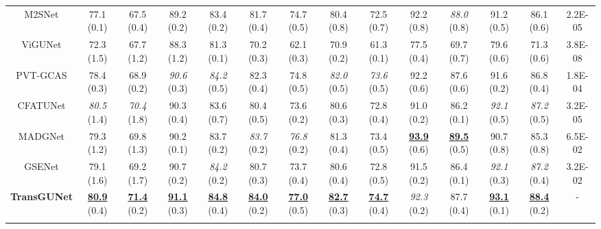 \begin{table*}[t]
\begin{tabular}{c|cc|cc|cc|cc|cc|cc|c}
     M2SNet \cite{zhao2023m}         & 77.1 \tiny{(0.1)} & 67.5 \tiny{(0.4)} & 89.2 \tiny{(0.2)} & 83.4 \tiny{(0.2)} & 81.7 \tiny{(0.4)} & 74.7 \tiny{(0.5)} & 80.4 \tiny{(0.8)} & 72.5 \tiny{(0.7)} & 92.2 \tiny{(0.8)} & \textit{88.0} \tiny{(0.8)} & 91.2 \tiny{(0.5)} & 86.1 \tiny{(0.6)} & 2.2E-05 \\
     ViGUNet \cite{jiang2023vig}     & 72.3 \tiny{(1.5)} & 67.7 \tiny{(1.2)} & 88.3 \tiny{(1.2)} & 81.3 \tiny{(0.1)} & 70.2 \tiny{(0.3)} & 62.1 \tiny{(0.3)} & 70.9 \tiny{(0.2)} & 61.3 \tiny{(0.1)} & 77.5 \tiny{(0.4)} & 69.7 \tiny{(0.7)} & 79.6 \tiny{(0.6)} & 71.3 \tiny{(0.6)} & 3.8E-08 \\
     PVT-GCAS \cite{rahman2024g}    & 78.4 \tiny{(0.3)} & 68.9 \tiny{(0.2)} & \textit{90.6} \tiny{(0.3)} & \textit{84.2} \tiny{(0.5)} & 82.3 \tiny{(0.4)} & 74.8 \tiny{(0.5)} & \textit{82.0} \tiny{(0.5)} & \textit{73.6} \tiny{(0.5)} & 92.2 \tiny{(0.6)} & 87.6 \tiny{(0.6)} & 91.6 \tiny{(0.2)} & 86.8 \tiny{(0.4)} & 1.8E-04 \\
     CFATUNet \cite{wang2024cfatransunet}     & \textit{80.5} \tiny{(1.4)} & \textit{70.4} \tiny{(1.8)} & 90.3 \tiny{(0.4)} & 83.6 \tiny{(0.7)} & 80.4 \tiny{(0.5)} & 73.6 \tiny{(0.2)} & 80.6 \tiny{(0.3)} & 72.8 \tiny{(0.4)} & 91.0 \tiny{(0.2)} & 86.2 \tiny{(0.1)} & \textit{92.1} \tiny{(0.5)} & \textit{87.2} \tiny{(0.5)} & 3.2E-05 \\
     MADGNet \cite{nam2024modality}         & 79.3 \tiny{(1.2)} & 69.8 \tiny{(1.3)} & 90.2 \tiny{(0.1)} & 83.7 \tiny{(0.2)} & \textit{83.7} \tiny{(0.2)} & \textit{76.8} \tiny{(0.2)} & 81.3 \tiny{(0.4)} & 73.4 \tiny{(0.5)} & \textbf{\underline{93.9}} \tiny{(0.6)} & \textbf{\underline{89.5}} \tiny{(0.5)} & 90.7 \tiny{(0.8)} & 85.3 \tiny{(0.8)}  & 6.5E-02 \\ 
     GSENet \cite{li2025gse} & 79.1 \tiny{(1.6)} & 69.2 \tiny{(1.7)} & 90.7 \tiny{(0.2)} & \textit{84.2} \tiny{(0.2)} & 80.7 \tiny{(0.3)} & 73.7 \tiny{(0.4)} & 80.6 \tiny{(0.4)} & 72.8 \tiny{(0.5)} & 91.5 \tiny{(0.2)} & 86.4 \tiny{(0.1)} & \textit{92.1} \tiny{(0.3)} & \textit{87.2} \tiny{(0.4)} & 3.2E-02 \\
     \hline
     \multicolumn{1}{c|}{\multirow{2}{*}{\textbf{TransGUNet}}} & \textbf{\underline{80.9}}  \tiny{(0.4)} & \textbf{\underline{71.4}}  \tiny{(0.2)} & \textbf{\underline{91.1}}  \tiny{(0.3)} & \textbf{\underline{84.8}}  \tiny{(0.4)} & \textbf{\underline{84.0}} \tiny{(0.2)} & \textbf{\underline{77.0}} \tiny{(0.5)} & \textbf{\underline{82.7}} \tiny{(0.3)} & \textbf{\underline{74.7}} \tiny{(0.4)} & \textit{92.3} \tiny{(0.2)} & 87.7 \tiny{(0.4)} & \textbf{\underline{93.1}} \tiny{(0.1)} & \textbf{\underline{88.4}} \tiny{(0.2)} & \multicolumn{1}{c}{\multirow{2}{*}{-}} \\ \cline{2-13}

\end{tabular}
\end{table*}
